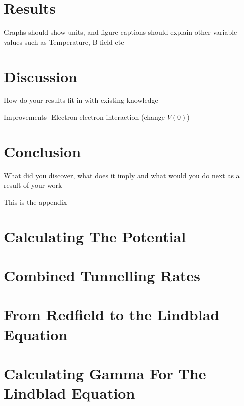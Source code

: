 \documentclass{article}
\begin{document}
\section{Results}
Graphs should show units, and figure captions should explain other variable values such as Temperature, B
field etc

\section{Discussion}
How do your results fit in with existing knowledge

Improvements
-Electron electron interaction (change \(V(0)\))


\section{Conclusion}\label{sec:conclusion}
What did you discover, what does it imply and what would you do next as a result of your work

\printbibliography{}

\begin{appendix}
    This is the appendix
    \section{Calculating The Potential}\label{app:interaction potential calculation}
    

    \section{Combined Tunnelling Rates}\label{app:combined tunnelling rates}
    

    \section{From Redfield to the Lindblad Equation}\label{app:redfield to lindblad}
    

    \section{Calculating Gamma For The Lindblad Equation}
    


\end{appendix}
\end{document}
